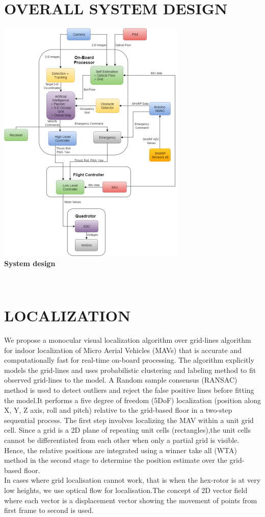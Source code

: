 \documentclass[12pt]{article}
\begin{document}
\section{OVERALL SYSTEM DESIGN}
\begin{center}\includegraphics[scale=0.5]{image22} \\
\textbf{System design}\end{center} \\

\section{LOCALIZATION}
We propose a monocular visual localization algorithm over grid-lines algorithm for indoor  localization  of  Micro  Aerial Vehicles  (MAVs)  that  is  accurate  and  computationally  fast for  real-time  on-board  processing. The algorithm  explicitly models  the  grid-lines  and  uses  probabilistic  clustering  and labeling  method  to  fit  observed  grid-lines  to  the  model.  A Random sample consensus (RANSAC) method is used to detect outliers and reject the false positive lines before fitting the model.It performs a five degree of freedom (5DoF) localization (position along X, Y, Z axis, roll and pitch) relative to  the  grid-based  floor  in  a  two-step  sequential  process.  The first step involves localizing the MAV within a unit grid cell. Since a grid is a 2D plane of repeating unit cells (rectangles),the  unit  cells  cannot  be  differentiated  from  each  other  when only a partial grid is visible. Hence, the relative positions are integrated using a winner take all (WTA) method in the second stage  to  determine  the  position  estimate  over  the  grid-based floor.\\
In cases where grid localisation cannot work, that is when the hex-rotor is at very low heights, we use optical flow for localisation.The concept of 2D vector field where each vector is a displacement vector showing the movement of points from first frame to second is used.
\end{document}
